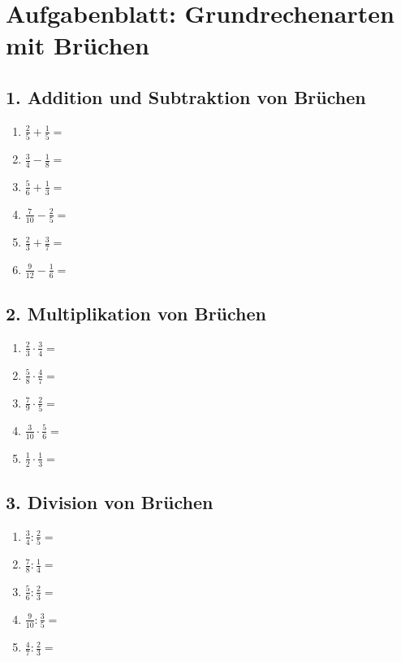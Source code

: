 
\section*{Aufgabenblatt: Grundrechenarten mit Brüchen}

\subsection*{1. Addition und Subtraktion von Brüchen}
\begin{enumerate}[label=\alph*)]
    \item \( \frac{2}{5} + \frac{1}{5} = \)
    \item \( \frac{3}{4} - \frac{1}{8} = \)
    \item \( \frac{5}{6} + \frac{1}{3} = \)
    \item \( \frac{7}{10} - \frac{2}{5} = \)
    \item \( \frac{2}{3} + \frac{3}{7} = \)
    \item \( \frac{9}{12} - \frac{1}{6} = \)
\end{enumerate}

\subsection*{2. Multiplikation von Brüchen}
\begin{enumerate}[label=\alph*)]
    \item \( \frac{2}{3} \cdot \frac{3}{4} = \)
    \item \( \frac{5}{8} \cdot \frac{4}{7} = \)
    \item \( \frac{7}{9} \cdot \frac{2}{5} = \)
    \item \( \frac{3}{10} \cdot \frac{5}{6} = \)
    \item \( \frac{1}{2} \cdot \frac{1}{3} = \)
\end{enumerate}

\subsection*{3. Division von Brüchen}
\begin{enumerate}[label=\alph*)]
    \item \( \frac{3}{4} : \frac{2}{5} = \)
    \item \( \frac{7}{8} : \frac{1}{4} = \)
    \item \( \frac{5}{6} : \frac{2}{3} = \)
    \item \( \frac{9}{10} : \frac{3}{5} = \)
    \item \( \frac{4}{7} : \frac{2}{3} = \)
\end{enumerate}

